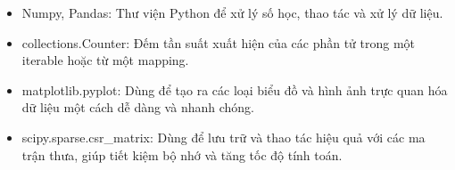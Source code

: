 \begin{itemize}
    \item Numpy, Pandas: Thư viện Python để xử lý số học, thao tác và xử lý dữ liệu.
    \item collections.Counter: Đếm tần suất xuất hiện của các phần tử trong một iterable hoặc từ một mapping.
    \item matplotlib.pyplot: Dùng để tạo ra các loại biểu đồ và hình ảnh trực quan hóa dữ liệu một cách dễ dàng và nhanh chóng.
    \item scipy.sparse.csr\_matrix: Dùng để lưu trữ và thao tác hiệu quả với các ma trận thưa, giúp tiết kiệm bộ nhớ và tăng tốc độ tính toán.
\end{itemize}

\pagebreak